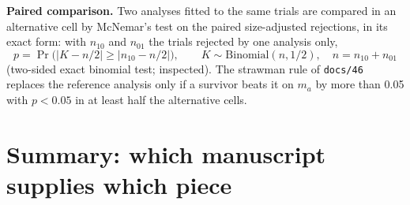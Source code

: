 \documentclass[11pt]{article}
\newcommand{\code}[1]{\texttt{#1}}
\begin{document}
\textbf{Paired comparison.} Two analyses fitted to the same trials are
compared in an alternative cell by McNemar's test on the paired
size-adjusted rejections, in its exact form: with $n_{10}$ and $n_{01}$
the trials rejected by one analysis only,
\begin{equation}
p = \Pr\big(|K - n/2| \ge |n_{10} - n/2|\big), \qquad
K \sim \mathrm{Binomial}(n, 1/2), \quad n = n_{10} + n_{01}
\label{eq:invd-mcnemar}
\end{equation}
(two-sided exact binomial test; inspected). The strawman rule of
\code{docs/46} replaces the reference analysis only if a survivor beats
it on $m_a$ by more than 0.05 with $p < 0.05$ in at least half the
alternative cells.

\section*{Summary: which manuscript supplies which piece}
\end{document}
